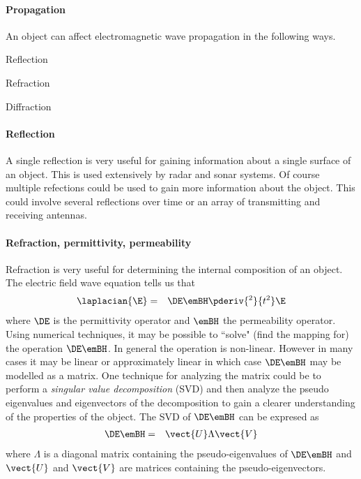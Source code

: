 \paragraph{Propagation}
An object can affect electromagnetic wave propagation in the following ways.
\begin{liste}
   \item Reflection
   \item Refraction
   \item Diffraction
\end{liste}

\paragraph{Reflection}
A single reflection is very useful for gaining information about a single surface of an object.
This is used extensively by radar and sonar systems.
Of course multiple refections could be used to gain more information about the object.
This could involve several reflections over time or an array of transmitting and receiving antennas.

\paragraph{Refraction, permittivity, permeability}
Refraction is very useful for determining the internal composition of an object.
The electric field wave equation tells us that
\begin{eqnarray*}
   \laplacian{\E} &=& \DE \emBH \pderiv{^2}{t^2}\E
\end{eqnarray*}
where $\DE$ is the permittivity operator and $\emBH$ the permeability operator.
Using numerical techniques, it may be possible to ``solve" (find the mapping for)
the operation $\DE \emBH$.
In general the operation is non-linear.
However in many cases it may be linear or approximately linear in which case
$\DE \emBH$ may be modelled as a matrix.
One technique for analyzing the matrix could be to perform a {\em singular value decomposition} (SVD)
and then analyze the pseudo eigenvalues and eigenvectors of the decomposition to
gain a clearer understanding of the properties of the object.  The SVD of $\DE\emBH$ can
be expresed as
\begin{eqnarray*}
   \DE\emBH &=& \vect{U} \Lambda \vect{V}
\end{eqnarray*}
where $\Lambda$ is a diagonal matrix containing the pseudo-eigenvalues of $\DE\emBH$
and $\vect{U}$ and $\vect{V}$ are matrices containing
the pseudo-eigenvectors.


